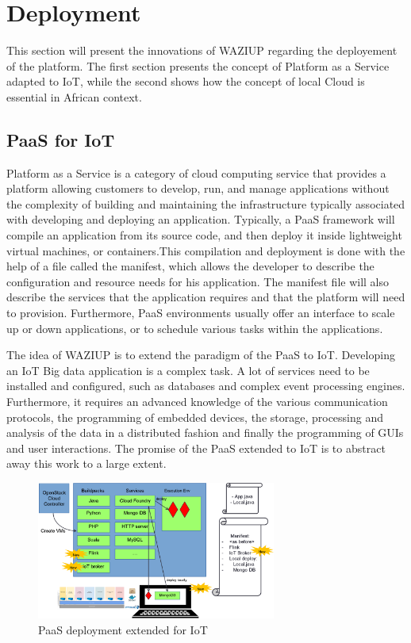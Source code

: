 

\section{Deployment}
\label{sec:deploy}

This section will present the innovations of WAZIUP regarding the deployement of the platform.
The first section presents the concept of Platform as a Service adapted to IoT, while the second shows how the concept of local Cloud is essential in African context.

\subsection{PaaS for IoT}

Platform as a Service is a category of cloud computing service that provides a platform allowing customers to develop, run, and manage applications without the complexity of building and maintaining the infrastructure typically associated with developing and deploying an application.
Typically, a PaaS framework will compile an application from its source code, and then deploy it inside lightweight virtual machines, or containers.This compilation and deployment is done with the help of a file called the manifest, which allows the developer to describe the configuration and resource needs for his application.
The manifest file will also describe the services that the application requires and that the platform will need to provision.
Furthermore, PaaS environments usually offer an interface to scale up or down applications, or to schedule various tasks within the applications.

The idea of WAZIUP is to extend the paradigm of the PaaS to IoT.
Developing an IoT Big data application is a complex task.
A lot of services need to be installed and configured, such as databases and complex event processing engines.
Furthermore, it requires an advanced knowledge of the various communication protocols, the programming of embedded devices, the storage, processing and analysis of the data in a distributed fashion and finally the programming of GUIs and user interactions.
The promise of the PaaS extended to IoT is to abstract away this work to a large extent.

\begin{figure}[h!]
\centering
\includegraphics[width=0.7\textwidth]{figs/paas.png}
\caption{PaaS deployment extended for IoT}
\label{fig:paas}
\end{figure}

